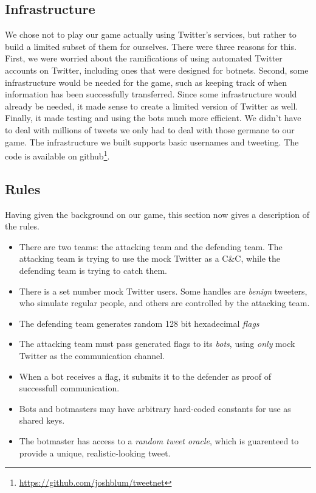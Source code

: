 \documentclass[11pt, oneside]{article} %
\numberwithin{equation}{section} %
\numberwithin{figure}{section} %
\numberwithin{table}{section} %
\begin{document}
	\subsection{Infrastructure}
		We chose not to play our game actually using Twitter's services, but rather to build a limited subset of them for ourselves. There were three reasons for this. First, we were worried about the ramifications of using automated Twitter accounts on Twitter, including ones that were designed for botnets. Second, some infrastructure would be needed for the game, such as keeping track of when information has been successfully transferred. Since some infrastructure would already be needed, it made sense to create a limited version of Twitter as well. Finally, it made testing and using the bots much more efficient. We didn't have to deal with millions of tweets we only had to deal with those germane to our game. The infrastructure we built supports basic usernames and tweeting. The code is available on github\footnote{\url{https://github.com/joshblum/tweetnet}}.

	\subsection{Rules}
		Having given the background on our game, this section now gives a description of the rules.
        
		\begin{itemize}
		 
         \item There are two teams: the attacking team and the defending team. The attacking team is trying to use the mock Twitter as a C\&C, while the defending team is trying to catch them.
		 
         \item There is a set number mock Twitter users. Some handles are \textit{benign} tweeters, who simulate regular people, and others are controlled by the attacking team.
		
         \item The defending team generates random 128 bit hexadecimal \textit{flags}
		 
         \item The attacking team must pass generated flags to its \textit{bots}, using \emph{only} mock Twitter as the communication channel.
		
        \item When a bot receives a flag, it submits it to the defender as proof of successfull communication.
        
        \item Bots and botmasters may have arbitrary hard-coded constants for use as shared keys.
        
        \item The botmaster has access to a \textit{random tweet oracle}, which is guarenteed to provide a unique, realistic-looking tweet.
		\end{itemize}
\end{document}
